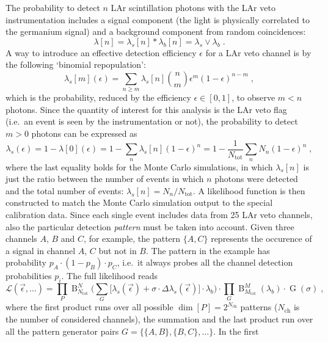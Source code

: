The probability to detect $n$ LAr scintillation photons with the LAr veto instrumentation
includes a signal component (the light is physically correlated to the germanium signal)
and a background component from random coincidences:
\[
  \lambda[n] = \lambda_s[n] * \lambda_b[n] = \lambda_s \vee \lambda_b \;.
\]
A way to introduce an effective detection efficiency $\epsilon$ for a LAr veto channel is
by the following `binomial repopulation':
\[
  \lambda_s[m](\epsilon) = \sum_{n \geq m} \lambda_s[n] \binom{n}{m} \epsilon^m
    {(1-\epsilon)}^{n-m} \;,
\]
which is the probability, reduced by the efficiency $\epsilon \in [0,1]$, to observe $m <
n$ photons. Since the quantity of interest for this analysis is the LAr veto flag (i.e.~an
event is seen by the instrumentation or not), the probability to detect $m > 0$ photons
can be expressed as
\[
  \lambda_s(\epsilon) = 1 - \lambda[0](\epsilon)
                      = 1 - \sum_n \lambda_s[n] {(1-\epsilon)}^n
                      = 1 - \frac{1}{N_\text{tot}} \sum_n N_n {(1-\epsilon)}^n \;,
\]
where the last equality holds for the Monte Carlo simulations, in which $\lambda_s[n]$ is
just the ratio between the number of events in which $n$ photons were detected and the
total number of events: $\lambda_s[n] = N_n / N_\text{tot}$.
\newpar
A likelihood function is then constructed to match the Monte Carlo simulation output to the
special calibration data. Since each single event includes data from 25 LAr veto channels,
also the particular detection \emph{pattern} must be taken into account. Given three channels
$A$, $B$ and $C$, for example, the pattern $\{A,C\}$ represents the occurence of a signal
in channel $A$, $C$ but not in $B$. The pattern in the example has probability $p_A
\cdot (1-p_B) \cdot p_C$, i.e.~it always probes all the channel detection probabilities
$p_i$. The full likelihood reads
\begin{equation}\label{eq:bkg:lar:ph2:pca-likelihood}
  \mathcal{L}(\vec{\epsilon}, \ldots) =
    \prod_P \operatorname{B}_{N_\text{tot}}^N \Big(
      \sum_G \big[ \lambda_s(\vec{\epsilon}) + \sigma \cdot
      \Delta\lambda_s(\vec{\epsilon})\big] \cdot \lambda_b 
    \Big)
    \cdot \prod_G \operatorname{B}_{M_\text{tot}}^M (\lambda_b) \cdot
    \operatorname{G}(\sigma) \;,
\end{equation}
where the first product runs over all possible $\dim{[P]} = 2^{N_\text{ch}}$ patterns
($N_\text{ch}$ is the number of considered channels), the summation and the last product
run over all the pattern generator pairs $G = \{\{A,B\},\{B,C\},\ldots\}$. In the first
